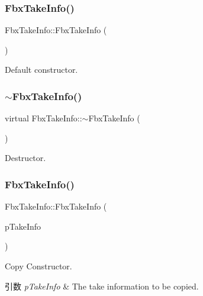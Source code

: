 \subsubsection{\texorpdfstring{Fbx\+Take\+Info()}{FbxTakeInfo()}\hspace{0.1cm}{\footnotesize\ttfamily [1/2]}}
{\footnotesize\ttfamily Fbx\+Take\+Info\+::\+Fbx\+Take\+Info (\begin{DoxyParamCaption}{ }\end{DoxyParamCaption})}

Default constructor. \mbox{\label{class_fbx_take_info_aab3be12b6326df91b6dea9601e9f079f}} 
\subsubsection{\texorpdfstring{$\sim$\+Fbx\+Take\+Info()}{~FbxTakeInfo()}}
{\footnotesize\ttfamily virtual Fbx\+Take\+Info\+::$\sim$\+Fbx\+Take\+Info (\begin{DoxyParamCaption}{ }\end{DoxyParamCaption})\hspace{0.3cm}{\ttfamily [virtual]}}

Destructor. \mbox{\label{class_fbx_take_info_a5789a72ffbcf99bc3501f6d52ff3912e}} 
\subsubsection{\texorpdfstring{Fbx\+Take\+Info()}{FbxTakeInfo()}\hspace{0.1cm}{\footnotesize\ttfamily [2/2]}}
{\footnotesize\ttfamily Fbx\+Take\+Info\+::\+Fbx\+Take\+Info (\begin{DoxyParamCaption}\item[{const \hyperlink{class_fbx_take_info}{Fbx\+Take\+Info} \&}]{p\+Take\+Info }\end{DoxyParamCaption})}

Copy Constructor. 
\begin{DoxyParams}{引数}
{\em p\+Take\+Info} & The take information to be copied. \\
\hline
\end{DoxyParams}


